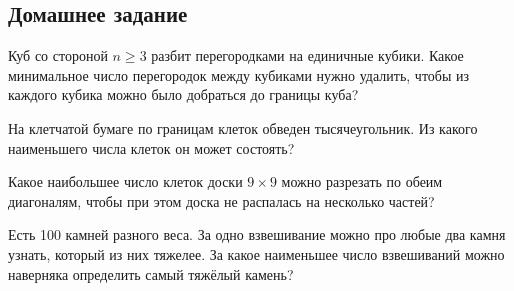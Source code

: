 

\subsection*{Домашнее задание}



\begin{problems}

\item
Куб со стороной $n \geq 3$ разбит перегородками на единичные кубики.
Какое минимальное число перегородок между кубиками нужно удалить, чтобы
из каждого кубика можно было добраться до границы куба?

\item
На клетчатой бумаге по границам клеток обведен тысячеугольник.
Из какого наименьшего числа клеток он может состоять?

\item
Какое наибольшее число клеток доски $9 \times 9$ можно разрезать по обеим
диагоналям, чтобы при этом доска не распалась на несколько частей?

\item
Есть 100 камней разного веса.
За одно взвешивание можно про любые два камня узнать, который из них тяжелее.
За какое наименьшее число взвешиваний можно наверняка определить самый тяжёлый
камень?

\end{problems}

